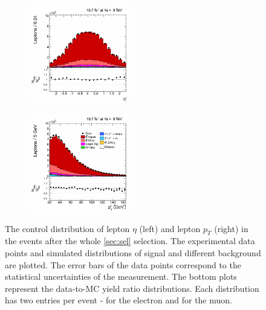  \begin{figure}[h]
 \centering
 \begin{subfigure}
   \centering
   \includegraphics[width=0.49\textwidth]{04_event_reconstruction/plots/basic_lepton_eta_step7.png}
 \end{subfigure}
 \begin{subfigure}
   \centering
   \includegraphics[width=0.49\textwidth]{04_event_reconstruction/plots/basic_lepton_pt_step7.png}
 \end{subfigure}
 \caption{The control distribution of lepton $\eta$ (left) and lepton $p_{T}$ (right) in the events after the whole \ref{sec:sel} selection. 
 The experimental data points and simulated distributions of signal and different background are plotted. The error bars of the data points
 correspond to the statistical uncertainties of the measurement. The bottom plots represent the data-to-MC yield ratio distributions. 
 Each distribution has two entries per event - for the electron and for the muon.}
 \label{fig:CPetaptLep}
 \end{figure}
 
